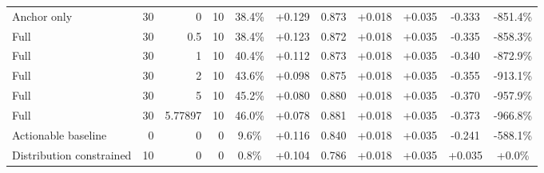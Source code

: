 \begin{table}[htbp]
\begin{tabular}{lrrrccccccc}
Anchor only & 30 & 0 & 10 & 38.4\% & +0.129 & 0.873 & +0.018 & +0.035 & -0.333 & -851.4\% \\
Full & 30 & 0.5 & 10 & 38.4\% & +0.123 & 0.872 & +0.018 & +0.035 & -0.335 & -858.3\% \\
Full & 30 & 1 & 10 & 40.4\% & +0.112 & 0.873 & +0.018 & +0.035 & -0.340 & -872.9\% \\
Full & 30 & 2 & 10 & 43.6\% & +0.098 & 0.875 & +0.018 & +0.035 & -0.355 & -913.1\% \\
Full & 30 & 5 & 10 & 45.2\% & +0.080 & 0.880 & +0.018 & +0.035 & -0.370 & -957.9\% \\
Full & 30 & 5.77897 & 10 & 46.0\% & +0.078 & 0.881 & +0.018 & +0.035 & -0.373 & -966.8\% \\
Actionable baseline & 0 & 0 & 0 & 9.6\% & +0.116 & 0.840 & +0.018 & +0.035 & -0.241 & -588.1\% \\
Distribution constrained & 10 & 0 & 0 & 0.8\% & +0.104 & 0.786 & +0.018 & +0.035 & +0.035 & +0.0\% \\
\bottomrule
\end{tabular}
\end{table}